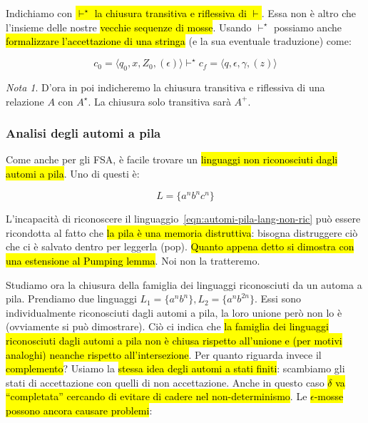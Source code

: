 \documentclass[a4paper,11pt,oneside]{article}
\theoremstyle{plain}
\theoremstyle{definition}
\theoremstyle{remark}
\newtheorem*{nota}{Nota}
\begin{document}
Indichiamo con \hl{$\vdash^\star$ la chiusura transitiva e riflessiva di
$\vdash$}. Essa non è altro che l'insieme delle nostre \hl{vecchie sequenze di
mosse}. Usando $\vdash^\star$ possiamo anche \hl{formalizzare l'accettazione di
una stringa} (e la sua eventuale traduzione) come:

\begin{equation}
  c_0 = \langle q_0, x, Z_0, (\epsilon) \rangle \vdash^\star
    c_f = \langle q, \epsilon, \gamma , (z) \rangle
\end{equation}

\begin{nota}
  D'ora in poi indicheremo la chiusura transitiva e riflessiva di una relazione
  $A$ con $A^\star$. La chiusura solo transitiva sarà $A^+$.
\end{nota}

\subsubsection{Analisi degli automi a pila}\label{sec:automi-pila-analisi}

Come anche per gli FSA, è facile trovare un \hl{linguaggi non riconosciuti dagli
automi a pila}. Uno di questi è:

\begin{equation}
  L = \{ a^n b^n c^n \}\label{eqn:automi-pila-lang-non-ric}
\end{equation}

L'incapacità di riconoscere il linguaggio~\ref{eqn:automi-pila-lang-non-ric} può
essere ricondotta al fatto che \hl{la pila è una memoria distruttiva}: bisogna
distruggere ciò che ci è salvato dentro per leggerla (pop). \hl{Quanto appena
detto si dimostra con una estensione al Pumping lemma}. Noi non la tratteremo.

Studiamo ora la chiusura della famiglia dei linguaggi riconosciuti da un automa
a pila. Prendiamo due linguaggi $L_1 = \{ a^n b^n \}, L_2 = \{ a^n b^{2n} \}$.
Essi sono individualmente riconosciuti dagli automi a pila, la loro unione però
non lo è (ovviamente si può dimostrare). Ciò ci indica che \hl{la famiglia dei
linguaggi riconosciuti dagli automi a pila non è chiusa rispetto all'unione e
(per motivi analoghi) neanche rispetto all'intersezione}. Per quanto riguarda
invece il \hl{complemento}? Usiamo la \hl{stessa idea degli automi a stati
finiti}: scambiamo gli stati di accettazione con quelli di non accettazione.
Anche in questo caso \hl{$\delta$ va ``completata'' cercando di evitare di
cadere nel non-determinismo}. Le \hl{$\epsilon$-mosse possono ancora causare
problemi}:
\end{document}
